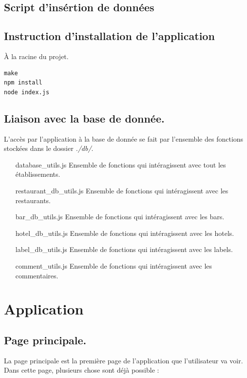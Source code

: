 \documentclass[a4paper,10pt]{article}
\begin{document}
\subsection{Script d'insértion de données}
    
    \pagebreak

\subsection{Instruction d'installation de l'application}
À la racine du projet.
\begin{lstlisting}
make
npm install
node index.js
\end{lstlisting}

\subsection{Liaison avec la base de donnée.}
L'accès par l'application à la base de donnée se fait par l'ensemble des
fonctions stockées dans le dossier \emph{./db/}.
\begin{itemize}
    \item [database\_utils.js] Ensemble de fonctions qui intéragissent avec tout les
        établissements.
    \item [restaurant\_db\_utils.js] Ensemble de fonctions qui intéragissent
        avec les restaurants.
    \item [bar\_db\_utils.js] Ensemble de fonctions qui intéragissent avec les
        bars.
    \item [hotel\_db\_utils.js] Ensemble de fonctions qui intéragissent avec
        les hotels.
    \item [label\_db\_utils.js] Ensemble de fonctions qui intéragissent avec
        les labels.
    \item [comment\_utils.js] Ensemble de fonctions qui intéragissent avec
        les commentaires.
\end{itemize}

\section{Application}
\subsection{Page principale.}
La page principale est la première page de l'application que l'utilisateur va
voir. Dans cette page, plusieurs chose sont déjà possible :
\end{document}
